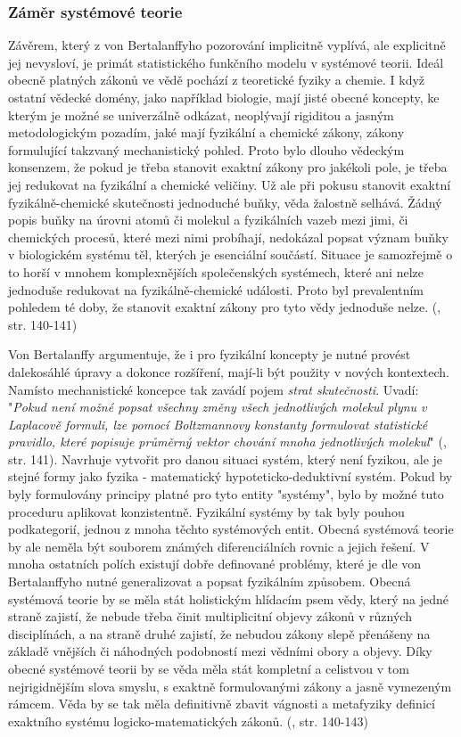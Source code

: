 \documentclass[11pt,a4paper]{article}
\begin{document}
\subsubsection{Záměr systémové teorie}

Závěrem, který z von Bertalanffyho pozorování implicitně vyplívá, ale explicitně jej nevysloví, je primát statistického funkčního modelu v systémové teorii. Ideál obecně platných zákonů ve vědě pochází z teoretické fyziky a chemie. I když ostatní vědecké domény, jako například biologie, mají jisté obecné koncepty, ke kterým je možné se univerzálně odkázat, neoplývají rigiditou a jasným metodologickým pozadím, jaké mají fyzikální a chemické zákony, zákony formulující takzvaný mechanistický pohled. Proto bylo dlouho vědeckým konsenzem, že pokud je třeba stanovit exaktní zákony pro jakékoli pole, je třeba jej redukovat na fyzikální a chemické veličiny. Už ale při pokusu stanovit exaktní fyzikálně-chemické skutečnosti jednoduché buňky, věda žalostně selhává. Žádný popis buňky na úrovni atomů či molekul a fyzikálních vazeb mezi jimi, či chemických procesů, které mezi nimi probíhají, nedokázal popsat význam buňky v biologickém systému těl, kterých je esenciální součástí. Situace je samozřejmě o to horší v mnohem komplexnějších společenských systémech, které ani nelze jednoduše redukovat na fyzikálně-chemické události. Proto byl prevalentním pohledem té doby, že stanovit exaktní zákony pro tyto vědy jednoduše nelze. (\cite{von_bertalanffy_outline_1950}, str. 140-141)

Von Bertalanffy argumentuje, že i pro fyzikální koncepty je nutné provést dalekosáhlé úpravy a dokonce rozšíření, mají-li být použity v nových kontextech. Namísto mechanistické koncepce tak zavádí pojem \textit{strat skutečnosti}. Uvadí:  "\textit{Pokud není možné popsat všechny změny všech jednotlivých molekul plynu v Laplacově formuli, lze pomocí Boltzmannovy konstanty formulovat statistické pravidlo, které popisuje průměrný vektor chování mnoha jednotlivých molekul}" (\cite*{von_bertalanffy_outline_1950}, str. 141). Navrhuje vytvořit pro danou situaci systém, který není fyzikou, ale je stejné formy jako fyzika - matematický hypoteticko-deduktivní systém. Pokud by byly formulovány principy platné pro tyto entity "systémy", bylo by možné tuto proceduru aplikovat konzistentně. Fyzikální systémy by tak byly pouhou podkategorií, jednou z mnoha těchto systémových entit. Obecná systémová teorie by ale neměla být souborem známých diferenciálních rovnic a jejich řešení. V mnoha ostatních polích existují dobře definované problémy, které je dle von Bertalanffyho nutné generalizovat a popsat fyzikálním způsobem. Obecná systémová teorie by se měla stát holistickým hlídacím psem vědy, který na jedné straně zajistí, že nebude třeba činit multiplicitní objevy zákonů v různých disciplínách, a na straně druhé zajistí, že nebudou zákony slepě přenášeny na základě vnějších či náhodných podobností mezi vědními obory a objevy. Díky obecné systémové teorii by se věda měla stát kompletní a celistvou v tom nejrigidnějším slova smyslu, s exaktně formulovanými zákony a jasně vymezeným rámcem. Věda by se tak měla definitivně zbavit vágnosti a metafyziky definicí exaktního systému logicko-matematických zákonů. (\cite{von_bertalanffy_outline_1950}, str. 140-143)
\end{document}

